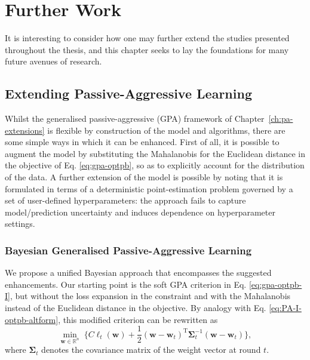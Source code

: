 \chapter{Further Work}
\label{ch:further-work}

\minitoc

It is interesting to consider how one may further extend the studies presented throughout the thesis, and this chapter seeks to lay the foundations for many future avenues of research.


\section{Extending Passive-Aggressive Learning}

Whilst the generalised passive-aggressive (GPA) framework of Chapter~\ref{ch:pa-extensions} is flexible by construction of the model and algorithms, there are some simple ways in which it can be enhanced. First of all, it is possible to augment the model by substituting the Mahalanobis for the Euclidean distance in the objective of Eq. \eqref{eq:gpa-optpb}, so as to explicitly account for the distribution of the data. A further extension of the model is possible by noting that it is formulated in terms of a deterministic point-estimation problem governed by a set of user-defined hyperparameters: the approach fails to capture model/prediction uncertainty and induces dependence on hyperparameter settings.

\subsection{Bayesian Generalised Passive-Aggressive Learning}

We propose a unified Bayesian approach that encompasses the suggested enhancements. Our starting point is the soft GPA criterion in Eq. \eqref{eq:gpa-optpb-I}, but without the loss expansion in the constraint and with the Mahalanobis instead of the Euclidean distance in the objective. By analogy with Eq. \eqref{eq:PA-I-optpb-altform}, this modified criterion can be rewritten as
\begin{equation}
\label{eq:modified-gpa-I-optpb}
	\min_{\mathbf{w} \in \mathbb{R}^n} \;
	\Big\{C\ell_{t}(\mathbf{w}) + \frac{1}{2}(\mathbf{w} - \mathbf{w}_t)^\text{T}\boldsymbol{\Sigma}_{t}^{-1}(\mathbf{w} - \mathbf{w}_t)\Big\},
\end{equation}
where $\boldsymbol{\Sigma}_{t}$ denotes the covariance matrix of the weight vector at round $t$.


